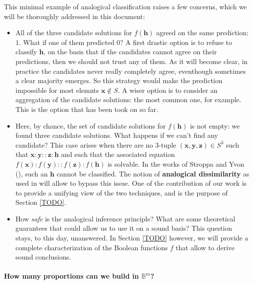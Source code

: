 This minimal example of analogical classification raises a few concerns, which
we will be thoroughly addressed in this document:
\begin{itemize}
  \item All of the three candidate solutions for $f(\mathbf{h})$ agreed on the
    same prediction: $1$. What if one of them predicted $0$? A first drastic
    option is to refuse to classify $\mathbf{h}$, on the basis that if the
    candidates cannot agree on their predictions, then we should not trust any
    of them. As it will become clear, in practice the candidates never really
    completely agree, eventhough sometimes a clear majority emerges. So this
    strategy would make the prediction impossible for most elemnts $\mathbf{x}
    \notin S$. A wiser option is to consider an aggregation of the candidate
    solutions: the most common one, for example. This is the option that has
    been took on so far.
  \item Here, by chance, the set of candidate solutions for $f(\mathbf{h})$ is
    not empty: we found three candidate solutions. What happens if we can't
    find any candidate? This case arises when there are no 3-tuple
    $(\mathbf{x}, \mathbf{y}, \mathbf{z}) \in S^3$ such that $\mathbf{x} :
    \mathbf{y}::\mathbf{z}:\mathbf{h}$ and such that the associated equation
    $f(\mathbf{x}):f(\mathbf{y})::f(\mathbf{z}):f(\mathbf{h})$ is solvable. In
    the works of Stroppa and Yvon (\cite{StrYvoCNLL05}), such an $\mathbf{h}$
    cannot be classified. The notion of \textbf{analogical dissimilarity}
    as used in \cite{BayMicDelIJCAI07} will allow to bypass this issue. One of
    the contribution of our work is to provide a unifying view of the two
    techniques, and is the purpose of Section \ref{TODO}.

  \item How \textit{safe} is the analogical inference principle? What are some
    theoretical guarantees that could allow us to use it on a sound basis? This
    question stays, to this day, unanswered. In Section \ref{TODO} however, we
    will provide a complete characterization of the Boolean functions $f$ that
    allow to derive sound conclusions.
\end{itemize}

\paragraph{How many proportions can we build in $\mathbb{B}^m$?\\}

